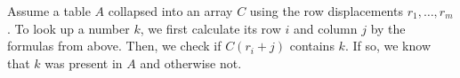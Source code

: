Assume a table $A$ collapsed into an array $C$ using the row displacements $r_1, \ldots, r_m$.
To look up a number $k$, we first calculate its row $i$ and column $j$ by the formulas from above.
Then, we check if $C( r_i + j )$ contains $k$.
If so, we know that $k$ was present in $A$ and otherwise not.

